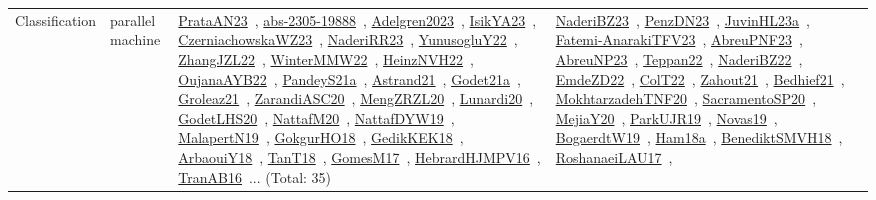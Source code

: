 {\begin{longtable}{lp{3cm}>{\raggedright\arraybackslash}p{6cm}>{\raggedright\arraybackslash}p{6cm}>{\raggedright\arraybackslash}p{8cm}}
Classification & parallel machine & \href{../works/PrataAN23.pdf}{PrataAN23}~\cite{PrataAN23}, \href{../works/abs-2305-19888.pdf}{abs-2305-19888}~\cite{abs-2305-19888}, \href{../works/Adelgren2023.pdf}{Adelgren2023}~\cite{Adelgren2023}, \href{../works/IsikYA23.pdf}{IsikYA23}~\cite{IsikYA23}, \href{../works/CzerniachowskaWZ23.pdf}{CzerniachowskaWZ23}~\cite{CzerniachowskaWZ23}, \href{../works/NaderiRR23.pdf}{NaderiRR23}~\cite{NaderiRR23}, \href{../works/YunusogluY22.pdf}{YunusogluY22}~\cite{YunusogluY22}, \href{../works/ZhangJZL22.pdf}{ZhangJZL22}~\cite{ZhangJZL22}, \href{../works/WinterMMW22.pdf}{WinterMMW22}~\cite{WinterMMW22}, \href{../works/HeinzNVH22.pdf}{HeinzNVH22}~\cite{HeinzNVH22}, \href{../works/OujanaAYB22.pdf}{OujanaAYB22}~\cite{OujanaAYB22}, \href{../works/PandeyS21a.pdf}{PandeyS21a}~\cite{PandeyS21a}, \href{../works/Astrand21.pdf}{Astrand21}~\cite{Astrand21}, \href{../works/Godet21a.pdf}{Godet21a}~\cite{Godet21a}, \href{../works/Groleaz21.pdf}{Groleaz21}~\cite{Groleaz21}, \href{../works/ZarandiASC20.pdf}{ZarandiASC20}~\cite{ZarandiASC20}, \href{../works/MengZRZL20.pdf}{MengZRZL20}~\cite{MengZRZL20}, \href{../works/Lunardi20.pdf}{Lunardi20}~\cite{Lunardi20}, \href{../works/GodetLHS20.pdf}{GodetLHS20}~\cite{GodetLHS20}, \href{../works/NattafM20.pdf}{NattafM20}~\cite{NattafM20}, \href{../works/NattafDYW19.pdf}{NattafDYW19}~\cite{NattafDYW19}, \href{../works/MalapertN19.pdf}{MalapertN19}~\cite{MalapertN19}, \href{../works/GokgurHO18.pdf}{GokgurHO18}~\cite{GokgurHO18}, \href{../works/GedikKEK18.pdf}{GedikKEK18}~\cite{GedikKEK18}, \href{../works/ArbaouiY18.pdf}{ArbaouiY18}~\cite{ArbaouiY18}, \href{../works/TanT18.pdf}{TanT18}~\cite{TanT18}, \href{../works/GomesM17.pdf}{GomesM17}~\cite{GomesM17}, \href{../works/HebrardHJMPV16.pdf}{HebrardHJMPV16}~\cite{HebrardHJMPV16}, \href{../works/TranAB16.pdf}{TranAB16}~\cite{TranAB16}... (Total: 35) & \href{../works/NaderiBZ23.pdf}{NaderiBZ23}~\cite{NaderiBZ23}, \href{../works/PenzDN23.pdf}{PenzDN23}~\cite{PenzDN23}, \href{../works/JuvinHL23a.pdf}{JuvinHL23a}~\cite{JuvinHL23a}, \href{../works/Fatemi-AnarakiTFV23.pdf}{Fatemi-AnarakiTFV23}~\cite{Fatemi-AnarakiTFV23}, \href{../works/AbreuPNF23.pdf}{AbreuPNF23}~\cite{AbreuPNF23}, \href{../works/AbreuNP23.pdf}{AbreuNP23}~\cite{AbreuNP23}, \href{../works/Teppan22.pdf}{Teppan22}~\cite{Teppan22}, \href{../works/NaderiBZ22.pdf}{NaderiBZ22}~\cite{NaderiBZ22}, \href{../works/EmdeZD22.pdf}{EmdeZD22}~\cite{EmdeZD22}, \href{../works/ColT22.pdf}{ColT22}~\cite{ColT22}, \href{../works/Zahout21.pdf}{Zahout21}~\cite{Zahout21}, \href{../works/Bedhief21.pdf}{Bedhief21}~\cite{Bedhief21}, \href{../works/MokhtarzadehTNF20.pdf}{MokhtarzadehTNF20}~\cite{MokhtarzadehTNF20}, \href{../works/SacramentoSP20.pdf}{SacramentoSP20}~\cite{SacramentoSP20}, \href{../works/MejiaY20.pdf}{MejiaY20}~\cite{MejiaY20}, \href{../works/ParkUJR19.pdf}{ParkUJR19}~\cite{ParkUJR19}, \href{../works/Novas19.pdf}{Novas19}~\cite{Novas19}, \href{../works/BogaerdtW19.pdf}{BogaerdtW19}~\cite{BogaerdtW19}, \href{../works/Ham18a.pdf}{Ham18a}~\cite{Ham18a}, \href{../works/BenediktSMVH18.pdf}{BenediktSMVH18}~\cite{BenediktSMVH18}, \href{../works/RoshanaeiLAU17.pdf}{RoshanaeiLAU17}~\cite{RoshanaeiLAU17}, 
\end{longtable}}

